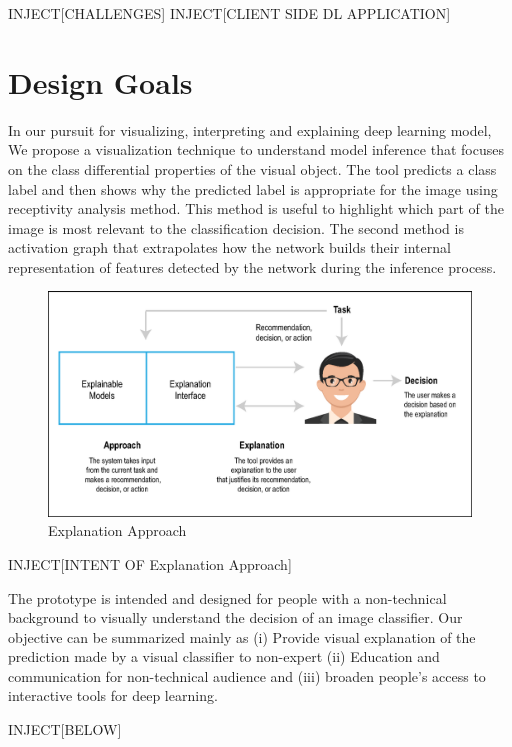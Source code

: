 INJECT[CHALLENGES]
INJECT[CLIENT SIDE DL APPLICATION]

\section{Design Goals}

In our pursuit for visualizing, interpreting and explaining deep learning model, We propose a visualization technique to understand model inference that focuses on the class differential properties of the visual object. The tool predicts a class label and then shows why the predicted label is appropriate for the image using receptivity analysis method. This method is useful to highlight which part of the image is most relevant to the classification decision. The second method is activation graph that extrapolates how the network builds their internal representation of  features detected by the network during the inference process.

\begin{figure}[htbp]
\centering
\includegraphics[width=1\textwidth]{images/xai-1.eps}
\caption{Explanation Approach}
\label{fig:explanation-approach}
\end{figure}

INJECT[INTENT OF Explanation Approach]

The prototype is intended and designed for people with a non-technical background to visually understand the decision of an image classifier. Our objective can be summarized mainly as (i) Provide visual explanation of the prediction made by a visual classifier to non-expert (ii) Education and communication for non-technical audience and (iii) broaden people's access to interactive tools for deep learning.

INJECT[BELOW]

